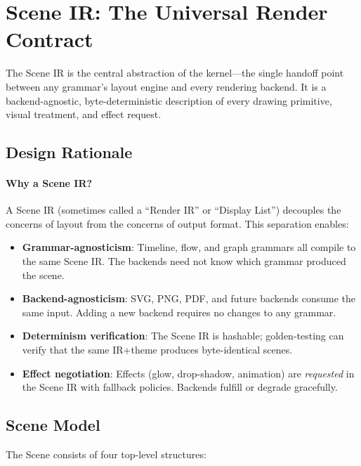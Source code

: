 \section{Scene IR: The Universal Render Contract}
\label{sec:scene-ir}

The Scene IR is the central abstraction of the kernel---the single handoff point between any grammar's layout engine and every rendering backend. It is a backend-agnostic, byte-deterministic description of every drawing primitive, visual treatment, and effect request.

\subsection{Design Rationale}

\paragraph{Why a Scene IR?}
A Scene IR (sometimes called a ``Render IR'' or ``Display List'') decouples the concerns of layout from the concerns of output format. This separation enables:

\begin{itemize}
  \item \textbf{Grammar-agnosticism}: Timeline, flow, and graph grammars all compile to the same Scene IR. The backends need not know which grammar produced the scene.
  
  \item \textbf{Backend-agnosticism}: SVG, PNG, PDF, and future backends consume the same input. Adding a new backend requires no changes to any grammar.
  
  \item \textbf{Determinism verification}: The Scene IR is hashable; golden-testing can verify that the same IR+theme produces byte-identical scenes.
  
  \item \textbf{Effect negotiation}: Effects (glow, drop-shadow, animation) are \emph{requested} in the Scene IR with fallback policies. Backends fulfill or degrade gracefully.
\end{itemize}

\subsection{Scene Model}
\label{sec:scene-model}

The Scene consists of four top-level structures:

